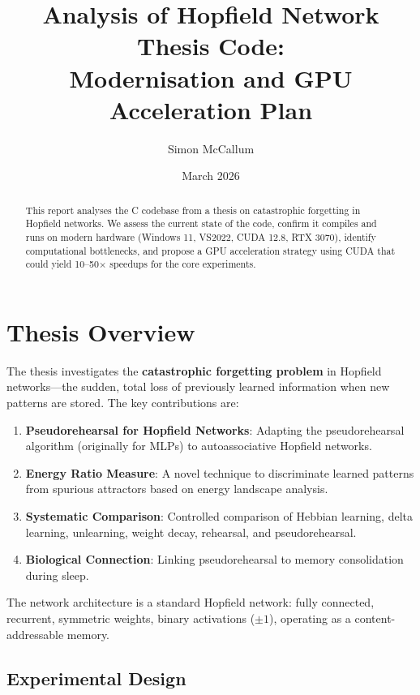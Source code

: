 \documentclass[11pt,a4paper]{article}
\title{Analysis of Hopfield Network Thesis Code:\\Modernisation and GPU Acceleration Plan}
\author{Simon McCallum}
\date{March 2026}
\begin{document}
\maketitle

\begin{abstract}
This report analyses the C codebase from a thesis on catastrophic forgetting in Hopfield networks. We assess the current state of the code, confirm it compiles and runs on modern hardware (Windows 11, VS2022, CUDA 12.8, RTX 3070), identify computational bottlenecks, and propose a GPU acceleration strategy using CUDA that could yield 10--50$\times$ speedups for the core experiments.
\end{abstract}

\tableofcontents
\newpage

\section{Thesis Overview}

The thesis investigates the \textbf{catastrophic forgetting problem} in Hopfield networks---the sudden, total loss of previously learned information when new patterns are stored. The key contributions are:

\begin{enumerate}
    \item \textbf{Pseudorehearsal for Hopfield Networks}: Adapting the pseudorehearsal algorithm (originally for MLPs) to autoassociative Hopfield networks.
    \item \textbf{Energy Ratio Measure}: A novel technique to discriminate learned patterns from spurious attractors based on energy landscape analysis.
    \item \textbf{Systematic Comparison}: Controlled comparison of Hebbian learning, delta learning, unlearning, weight decay, rehearsal, and pseudorehearsal.
    \item \textbf{Biological Connection}: Linking pseudorehearsal to memory consolidation during sleep.
\end{enumerate}

The network architecture is a standard Hopfield network: fully connected, recurrent, symmetric weights, binary activations ($\pm 1$), operating as a content-addressable memory.

\subsection{Experimental Design}
\end{document}
